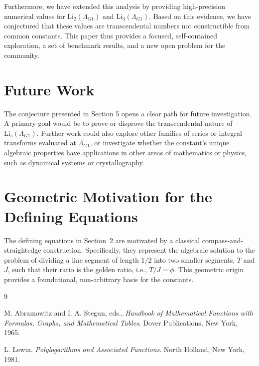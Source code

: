 \documentclass{amsart}
\theoremstyle{plain}
\theoremstyle{definition}
\theoremstyle{remark}
\newcommand{\LambdaG}{\Lambda_{G1}}
\begin{document}
Furthermore, we have extended this analysis by providing high-precision numerical values for $\mathrm{Li}_2(\LambdaG)$ and $\mathrm{Li}_3(\LambdaG)$. Based on this evidence, we have conjectured that these values are transcendental numbers not constructible from common constants. This paper thus provides a focused, self-contained exploration, a set of benchmark results, and a new open problem for the community.

\section{Future Work}
The conjecture presented in Section 5 opens a clear path for future investigation. A primary goal would be to prove or disprove the transcendental nature of $\mathrm{Li}_s(\LambdaG)$. Further work could also explore other families of series or integral transforms evaluated at $\LambdaG$, or investigate whether the constant's unique algebraic properties have applications in other areas of mathematics or physics, such as dynamical systems or crystallography.

\appendix
\section{Geometric Motivation for the Defining Equations}
\label{app:A}
The defining equations in Section~2 are motivated by a classical compass-and-straightedge construction. Specifically, they represent the algebraic solution to the problem of dividing a line segment of length $1/2$ into two smaller segments, $T$ and $J$, such that their ratio is the golden ratio, i.e., $T/J = \phi$. This geometric origin provides a foundational, non-arbitrary basis for the constants.

\begin{thebibliography}{9}

M. Abramowitz and I. A. Stegun, eds.,
\textit{Handbook of Mathematical Functions with Formulas, Graphs, and Mathematical Tables}.
Dover Publications, New York, 1965.

L. Lewin,
\textit{Polylogarithms and Associated Functions}.
North Holland, New York, 1981.

\end{thebibliography}
\end{document}
